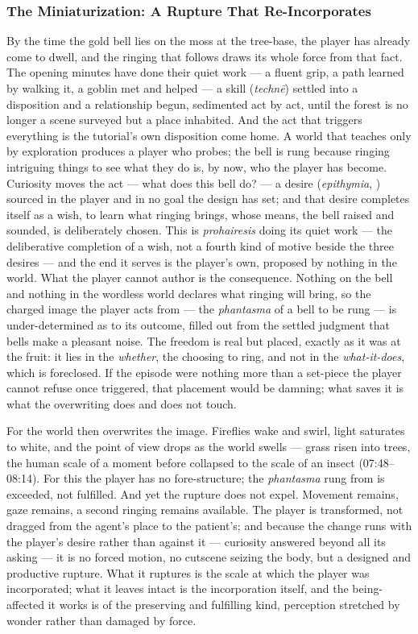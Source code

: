 \subsubsection*{The Miniaturization: A Rupture That Re-Incorporates}

By the time the gold bell lies on the moss at the tree-base, the player has already come to dwell, and the ringing that follows draws its whole force from that fact. The opening minutes have done their quiet work — a fluent grip, a path learned by walking it, a goblin met and helped — a skill (\textit{technē}) settled into a disposition and a relationship begun, sedimented act by act, until the forest is no longer a scene surveyed but a place inhabited. And the act that triggers everything is the tutorial's own disposition come home. A world that teaches only by exploration produces a player who probes; the bell is rung because ringing intriguing things to see what they do is, by now, who the player has become. Curiosity moves the act — what does this bell do? — a desire (\textit{epithymia}, ) sourced in the player and in no goal the design has set; and that desire completes itself as a wish, to learn what ringing brings, whose means, the bell raised and sounded, is deliberately chosen. This is \textit{prohairesis} doing its quiet work — the deliberative completion of a wish, not a fourth kind of motive beside the three desires — and the end it serves is the player's own, proposed by nothing in the world. What the player cannot author is the consequence. Nothing on the bell and nothing in the wordless world declares what ringing will bring, so the charged image the player acts from — the \textit{phantasma} of a bell to be rung — is under-determined as to its outcome, filled out from the settled judgment that bells make a pleasant noise. The freedom is real but placed, exactly as it was at the fruit: it lies in the \textit{whether}, the choosing to ring, and not in the \textit{what-it-does}, which is foreclosed. If the episode were nothing more than a set-piece the player cannot refuse once triggered, that placement would be damning; what saves it is what the overwriting does and does not touch.

For the world then overwrites the image. Fireflies wake and swirl, light saturates to white, and the point of view drops as the world swells — grass risen into trees, the human scale of a moment before collapsed to the scale of an insect (07:48--08:14). For this the player has no fore-structure; the \textit{phantasma} rung from is exceeded, not fulfilled. And yet the rupture does not expel. Movement remains, gaze remains, a second ringing remains available. The player is transformed, not dragged from the agent's place to the patient's; and because the change runs with the player's desire rather than against it — curiosity answered beyond all its asking — it is no forced motion, no cutscene seizing the body, but a designed and productive rupture. What it ruptures is the scale at which the player was incorporated; what it leaves intact is the incorporation itself, and the being-affected it works is of the preserving and fulfilling kind, perception stretched by wonder rather than damaged by force.

